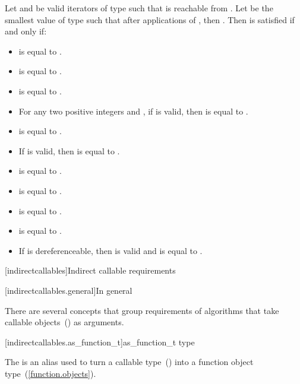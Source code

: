 \begin{addedblock}
\pnum
Let  and  be valid iterators of type  such that  is reachable
from . Let  be the smallest value of type
 such that after
 applications of , then . Then
 is satisfied if and only if:

\begin{itemize}
\item {} is equal to .
\item {} is equal to .
\item {} is equal to .
\item For any two positive integers  and , if  is valid, then
 is equal to .
\item {} is equal to .
\item If  is valid, then  is equal to .
\item {} is equal to .
\item {} is equal to .
\item {} is equal to .
\item {} is equal to .
\item If  is dereferenceable, then  is valid and is equal to .
\end{itemize}

[indirectcallables]{Indirect callable requirements}

[indirectcallables.general]{In general}

\pnum
There are several concepts that group requirements of algorithms that take callable
objects~() as arguments.


[indirectcallables.as_function_t]{as_function_t type}

\pnum
The  is an alias used to turn a
callable type~() into a function object type~(\ref{function.objects}).


\end{addedblock}
